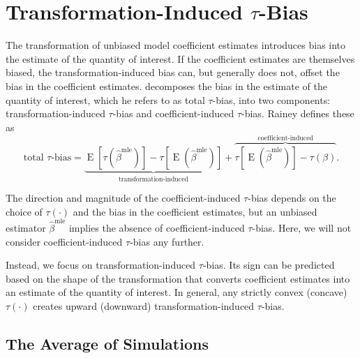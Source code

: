 \documentclass[11pt]{article}
\DeclareMathOperator*{\E}{\text{E}}
\begin{document}
\section*{Transformation-Induced $\tau$-Bias}

The transformation of unbiased model coefficient estimates introduces bias into the estimate of the quantity of interest. If the coefficient estimates are themselves biased, the transformation-induced bias can, but generally does not, offset the bias in the coefficient estimates. \citet[p. 404]{Rainey2017} decomposes the bias in the estimate of the quantity of interest, which he refers to as {total $\tau$-bias,} into two components: {transformation-induced $\tau$-bias} and {coefficient-induced $\tau$-bias.} Rainey defines these as
\begin{equation}
\text{total } \tau\text{-bias}= \underbrace{ \E[\tau(\hat{\beta}^\text{mle})]-  \tau[\E(\hat{\beta}^\text{mle})]  }_{\text{transformation-induced}} + \overbrace{  \tau[\E(\hat{\beta}^\text{mle})] - \tau(\beta)  }^{\text{coefficient-induced}}\text{.} \label{eqn:ti-bias}
\end{equation}

The direction and magnitude of the coefficient-induced $\tau$-bias depends on the choice of $\tau(\cdot)$ and the bias in the coefficient estimates, but an unbiased estimator $\hat{\beta}^\text{mle}$ implies the absence of coefficient-induced $\tau$-bias. Here, we will not consider coefficient-induced $\tau$-bias any further.


Instead, we focus on transformation-induced $\tau$-bias. Its sign can be predicted based on the shape of the transformation that converts coefficient estimates into an estimate of the quantity of interest. In general, any strictly convex (concave) $\tau(\cdot)$ creates upward (downward) transformation-induced $\tau$-bias.


\subsection*{The Average of Simulations}
\end{document}
